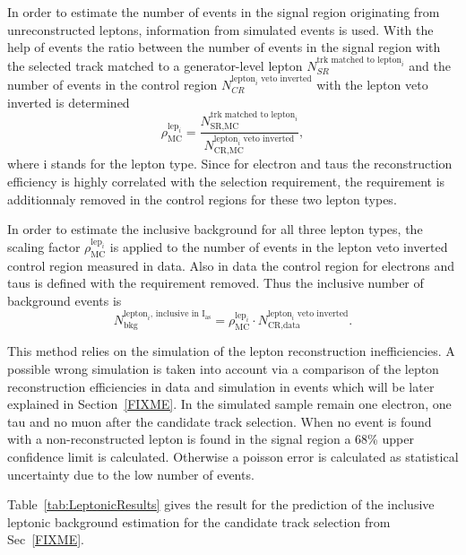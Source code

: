 In order to estimate the number of events in the signal region originating from unreconstructed leptons, information from simulated events is used.
With the help of \WJets events the ratio between the number of events in the signal region with the selected track matched to a generator-level lepton $N_{SR}^{\text{trk matched to lepton}_i}$
 and the number of events in the control region $N_{CR}^{\text{lepton}_i\text{ veto inverted}}$ with the lepton veto inverted is determined
\begin{equation*}
\rho_{\text{MC}}^{\text{lep}_i} = \frac{N_{\text{SR,MC}}^{\text{trk matched to lepton}_i}}{N_{\text{CR,MC}}^{\text{lepton}_i\text{ veto inverted}}},
\end{equation*}
where i stands for the lepton type.
Since for electron and taus the reconstruction efficiency is highly correlated with the \ecalo selection requirement, the \ecalo requirement is additionnaly removed in the control regions for these two lepton types. 

In order to estimate the inclusive background for all three lepton types, the scaling factor $\rho_{\text{MC}}^{\text{lep}_i}$ is applied to the number of events in the lepton veto inverted control region measured in data.
Also in data the control region for electrons and taus is defined with the \ecalo requirement removed. 
Thus the inclusive number of background events is 
\begin{equation*}
N^{\text{lepton}_i\text{, inclusive in I$_{\text{as}}$}}_{\text{bkg}} = \rho_{\text{MC}}^{\text{lep}_i} \cdot N_{\text{CR,data}}^{\text{lepton}_i\text{ veto inverted}}.
\end{equation*}

This method relies on the simulation of the lepton reconstruction inefficiencies.
A possible wrong simulation is taken into account via a comparison of the lepton reconstruction efficiencies in data and simulation in \Zlep events which will be later explained in Section~\ref{FIXME}.
In the simulated \WJets sample remain one electron, one tau and no muon after the candidate track selection. 
When no event is found with a non-reconstructed lepton is found in the signal region a 68\% upper confidence limit is calculated.
Otherwise a poisson error is calculated as statistical uncertainty due to the low number of events.

Table~\ref{tab:LeptonicResults} gives the result for the prediction of the inclusive leptonic background estimation for the candidate track selection from Sec~\ref{FIXME}.

